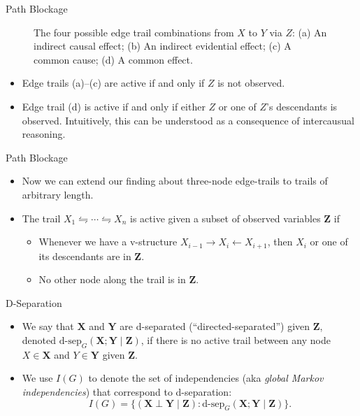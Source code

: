 \documentclass[11pt]{beamer}
\begin{document}
\begin{frame}{Path Blockage \cite{nirslides}}
\vspace{0pt}
\setlength{\topsep}{0pt}
\setlength{\partopsep}{0pt}
\begin{figure}[!t]
\centering
\trailseries
\caption*{\scriptsize The four possible edge trail combinations from $X$ to $Y$
via $Z$: (a) An indirect causal effect; (b) An indirect evidential effect; (c) A
common cause; (d) A common effect.}
\end{figure}
\begin{itemize}
	\item Edge trails (a)--(c) are active if and only if $Z$ is not
	observed.
	\item Edge trail (d) is active if and only if either $Z$ or one of $Z$'s
	descendants is observed. Intuitively, this can be understood as a
	consequence of intercausual reasoning.
\end{itemize}
\end{frame}

\begin{frame}{Path Blockage}
\begin{itemize}
	\item Now we can extend our finding about three-node edge-trails to
	trails of arbitrary length.
	\item The trail $X_{1} \leftrightharpoons \cdots \leftrightharpoons
	X_{n}$ is active given a subset of observed variables $\boldsymbol{Z}$
	if
	\begin{itemize}
		\item Whenever we have a v-structure $X_{i-1} \rightarrow X_{i}
		\leftarrow X_{i+1}$, then $X_{i}$ or one of its descendants are
		in $\boldsymbol{Z}$.
		\item No other node along the trail is in $\boldsymbol{Z}$.
	\end{itemize}
\end{itemize}
\end{frame}

\begin{frame}{D-Separation}
\begin{itemize}
	\item We say that $\boldsymbol{X}$ and $\boldsymbol{Y}$ are d-separated
	(``directed-separated'') given $\boldsymbol{Z}$, denoted
	$\text{d-sep}_{G}(\boldsymbol{X};\boldsymbol{Y}\;|\;\boldsymbol{Z})$, if
	there is no active trail between any node $X \in \boldsymbol{X}$ and $Y
	\in \boldsymbol{Y}$ given $\boldsymbol{Z}$.
	\item We use $I(G)$ to denote the set of independencies (aka
	\emph{global Markov independencies}) that correspond to d-separation:
	\[
		I(G) = \{(\boldsymbol{X} \perp \boldsymbol{Y} \;|\;
		\boldsymbol{Z}) : \text{d-sep}_{G}(\boldsymbol{X};
		\boldsymbol{Y} \;|\; \boldsymbol{Z})\}.
	\]
\end{itemize}
\end{frame}
\end{document}
